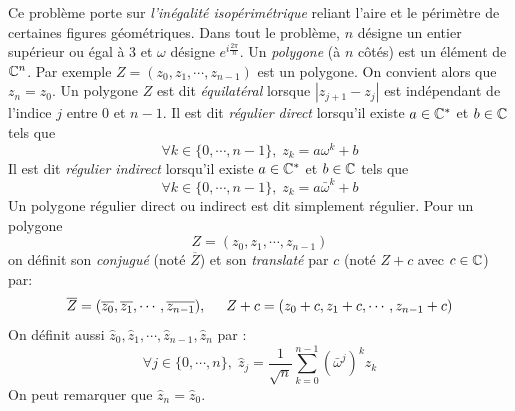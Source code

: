 Ce problème porte sur \emph{l'inégalité isopérimétrique} reliant l'aire et le périmètre de certaines figures géométriques.\newline
Dans tout le problème, $n$ désigne un entier supérieur ou égal à $3$ et $\omega$ désigne $e^{i\frac{2\pi}{n}}$.\newline
Un \emph{polygone} (à $n$ côtés) est un élément de $\mathbb{C}^n$. Par exemple $Z=(z_0,z_1,\cdots,z_{n-1})$ est un polygone. On convient alors que $z_n=z_0$.\newline
Un polygone $Z$ est dit \emph{équilatéral} lorsque $|z_{j+1} -z_j|$ est indépendant de l'indice $j$ entre $0$ et $n-1$.\newline
Il est dit \emph{régulier direct} lorsqu'il existe $a\in \mathbb{C}^*$ et $b\in \mathbb{C}$ tels que 
\begin{displaymath}
 \forall k\in \{0,\cdots,n-1\},\; z_k = a\omega ^k + b
\end{displaymath}
Il est dit \emph{régulier indirect} lorsqu'il existe $a\in \mathbb{C}^*$ et $b\in \mathbb{C}$ tels que 
\begin{displaymath}
 \forall k\in \{0,\cdots,n-1\},\; z_k = a\bar{\omega} ^k + b
\end{displaymath}
Un polygone régulier direct ou indirect est dit simplement régulier.\newline
Pour un polygone 
\begin{displaymath}
 Z= (z_0,z_1,\cdots,z_{n-1})
\end{displaymath}
on définit son \emph{conjugué} (noté $\overline{Z}$) et son \emph{translaté} par $c$ (noté $Z+c$ avec $c\in \mathbb{C}$) par:
\begin{displaymath}
 \overline{Z} = (\overline{z_0},\overline{z_1},\cdots,\overline{z_{n-1}}),\hspace{0.5cm}
Z + c =(z_0+c, z_1+c, \cdots, z_{n-1}+c)
\end{displaymath}
On définit aussi $\widehat{z}_0, \widehat{z}_1, \cdots,\widehat{z}_{n-1}, \widehat{z}_{n}$ par :
\begin{displaymath}
 \forall j\in \{0,\cdots,n\},\; \widehat{z}_j = \frac{1}{\sqrt{n}}\sum_{k=0}^{n-1}(\bar{\omega}^j)^k z_k
\end{displaymath}
On peut remarquer que $\widehat{z}_{n} = \widehat{z}_{0}$.
